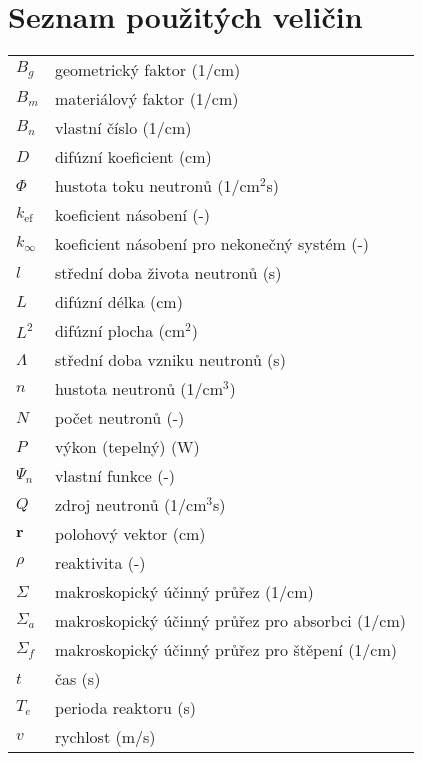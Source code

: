 \section*{Seznam použitých veličin}

\renewcommand{\arraystretch}{1.2}
\begin{table}[H]
\begin{tabular}{p{1cm}l}
  $B_g$           & geometrický faktor (1/cm) \\
  $B_m$           & materiálový faktor (1/cm) \\
  $B_n$           & vlastní číslo (1/cm) \\
  $D$             & difúzní koeficient (cm) \\
  $\Phi$          & hustota toku neutronů (1/cm$^2$s) \\
  $k_{\text{ef}}$ & koeficient násobení (-) \\
  $k_{\infty}$    & koeficient násobení pro nekonečný systém (-) \\
  $l$             & střední doba života neutronů (s) \\
  $L$             & difúzní délka (cm) \\
  $L^2$           & difúzní plocha (cm$^2$) \\
  $\Lambda$       & střední doba vzniku neutronů (s) \\
  $n$             & hustota neutronů (1/cm$^3$) \\
  $N$             & počet neutronů (-) \\
  $P$             & výkon (tepelný) (W) \\
  $\Psi_n$        & vlastní funkce (-) \\
  $Q$             & zdroj neutronů (1/cm$^3$s) \\
  $\textbf{r}$    & polohový vektor (cm) \\
  $\rho$          & reaktivita (-) \\
  $\Sigma$        & makroskopický účinný průřez (1/cm) \\
  $\Sigma_a$      & makroskopický účinný průřez pro absorbci (1/cm) \\
  $\Sigma_f$      & makroskopický účinný průřez pro štěpení (1/cm) \\
  $t$             & čas (s) \\
  $T_e$           & perioda reaktoru (s) \\
  $v$             & rychlost (m/s) \\

\end{tabular}
\end{table}
\renewcommand{\arraystretch}{1}
